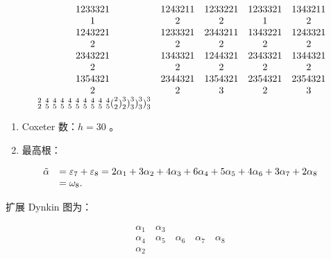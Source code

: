 \[
\begin{array}{c c c c c} 1   2   3   3   3   2   1 & 1   2   4   3   2   1   1 & 1   2   3   3   2   2   1 & 1   2   3   3   3   2   1 & 1   3   4   3   2   1   1 \\ 1 & 2 & 2 & 1 & 2 \\ 1   2   4   3   2   2   1 & 1   2   3   3   3   2   1 & 2   3   4   3   2   1   1 & 1   3   4   3   2   2   1 & 1   2   4   3   3   2   1 \\ 2 & 2 & 2 & 2 & 2 \\ 2   3   4   3   2   2   1 & 1   3   4   3   3   2   1 & 1   2   4   4   3   2   1 & 2   3   4   3   3   2   1 & 1   3   4   4   3   2   1 \\ 2 & 2 & 2 & 2 & 2 \\ 1   3   5   4   3   2   1 & 2   3   4   4   3   2   1 & 1   3   5   4   3   2   1 & 2   3   5   4   3   2   1 & 2   3   5   4   3   2   1 \\ 2 & 2 & 3 & 2 & 3 \\ \text { } _ {2} ^ {2} \text { } _ {5} ^ {4} \text { } _ {5} ^ {4} \text { } _ {5} ^ {4} \text { } _ {5} ^ {4} \text { } _ {5} ^ {4} \text { } _ {5} ^ {4} \text { } _ {5} ^ {4} \text { } _ {5} ^ {4} \text { } _ {5} ^ {4} \text {(} _ {2} ^ {2} \text {)} _ {2} ^ {3} \text {)} _ {3} ^ {3} \text {)} _ {3} ^ {3} \text {)} _ {3} ^ {3} \end{array}
\]

\begin{enumerate}
\def\labelenumi{(\Roman{enumi})}
\setcounter{enumi}{2}
\item
  Coxeter 数：\(h = 30\) 。
\item
  最高根：
\end{enumerate}

\[
\begin{array}{r l} \tilde {\alpha} & = \varepsilon_ {7} + \varepsilon_ {8} = 2 \alpha_ {1} + 3 \alpha_ {2} + 4 \alpha_ {3} + 6 \alpha_ {4} + 5 \alpha_ {5} + 4 \alpha_ {6} + 3 \alpha_ {7} + 2 \alpha_ {8} \\ & = \omega_ {8}. \end{array}
\]

扩展 Dynkin 图为：

\[
\begin{array}{c} \alpha_ {1} \quad \alpha_ {3} \\ \alpha_ {4} \quad \alpha_ {5} \quad \alpha_ {6} \quad \alpha_ {7} \quad \alpha_ {8} \\ \alpha_ {2} \end{array}
\]

